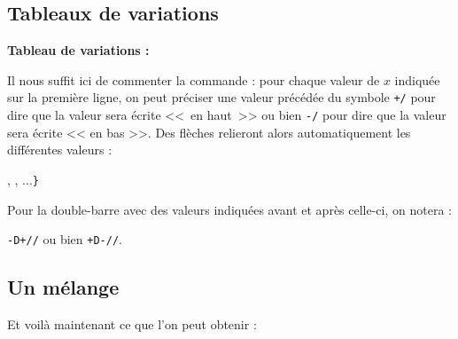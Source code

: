  \subsection{Tableaux de variations}

 {\NewFont
\begin{CenterExample}
    \textbf{Tableau de variations :}\par
\end{CenterExample}
}\bigskip

Il nous suffit ici de commenter la commande  : pour chaque valeur de $x$ indiquée sur la première ligne, on peut préciser une valeur précédée du symbole \verb!+/! pour dire que la valeur sera écrite <<~en haut~>> ou bien \verb!-/! pour dire que la valeur sera écrite << en bas >>. Des flèches relieront alors automatiquement les différentes valeurs :
\begin{center}
     ,  , ...{\tt\}}
\end{center}

\begin{info}
    Pour la double-barre avec des valeurs indiquées avant et après celle-ci, on notera :\par {\tt -D+//} ou bien {\tt +D-//}.
\end{info}

\subsection{Un mélange}
Et voilà maintenant ce que l'on peut obtenir :

 {\NewFont
\begin{CenterExample}
\end{CenterExample}
}


